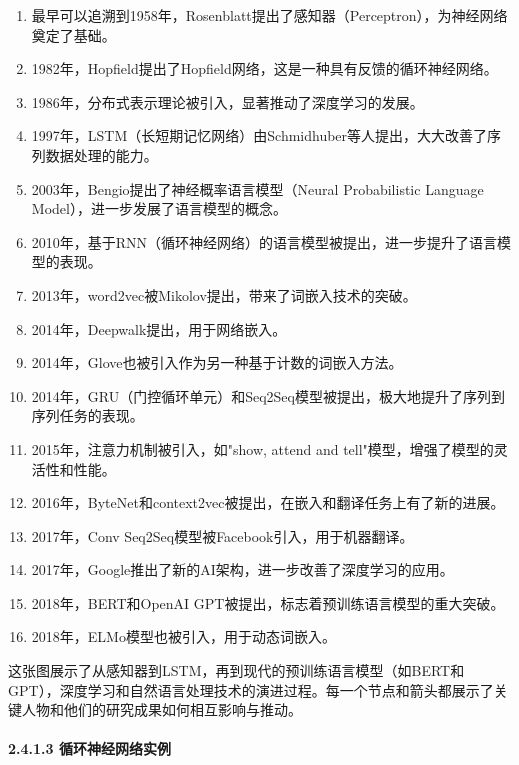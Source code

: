 \begin{enumerate}
\def\labelenumi{\arabic{enumi}.}
\item
  最早可以追溯到1958年，Rosenblatt提出了感知器（Perceptron），为神经网络奠定了基础。
\item
  1982年，Hopfield提出了Hopfield网络，这是一种具有反馈的循环神经网络。
\item
  1986年，分布式表示理论被引入，显著推动了深度学习的发展。
\item
  1997年，LSTM（长短期记忆网络）由Schmidhuber等人提出，大大改善了序列数据处理的能力。
\item
  2003年，Bengio提出了神经概率语言模型（Neural Probabilistic Language
  Model），进一步发展了语言模型的概念。
\item
  2010年，基于RNN（循环神经网络）的语言模型被提出，进一步提升了语言模型的表现。
\item
  2013年，word2vec被Mikolov提出，带来了词嵌入技术的突破。
\item
  2014年，Deepwalk提出，用于网络嵌入。
\item
  2014年，Glove也被引入作为另一种基于计数的词嵌入方法。
\item
  2014年，GRU（门控循环单元）和Seq2Seq模型被提出，极大地提升了序列到序列任务的表现。
\item
  2015年，注意力机制被引入，如"show, attend and
  tell"模型，增强了模型的灵活性和性能。
\item
  2016年，ByteNet和context2vec被提出，在嵌入和翻译任务上有了新的进展。
\item
  2017年，Conv Seq2Seq模型被Facebook引入，用于机器翻译。
\item
  2017年，Google推出了新的AI架构，进一步改善了深度学习的应用。
\item
  2018年，BERT和OpenAI GPT被提出，标志着预训练语言模型的重大突破。
\item
  2018年，ELMo模型也被引入，用于动态词嵌入。
\end{enumerate}

这张图展示了从感知器到LSTM，再到现代的预训练语言模型（如BERT和GPT），深度学习和自然语言处理技术的演进过程。每一个节点和箭头都展示了关键人物和他们的研究成果如何相互影响与推动。

\paragraph{\texorpdfstring{\textbf{2.4.1.3
循环神经网络实例}}{2.4.1.3 循环神经网络实例}}\label{2413-ux5faaux73afux795eux7ecfux7f51ux7edcux5b9eux4f8b}

